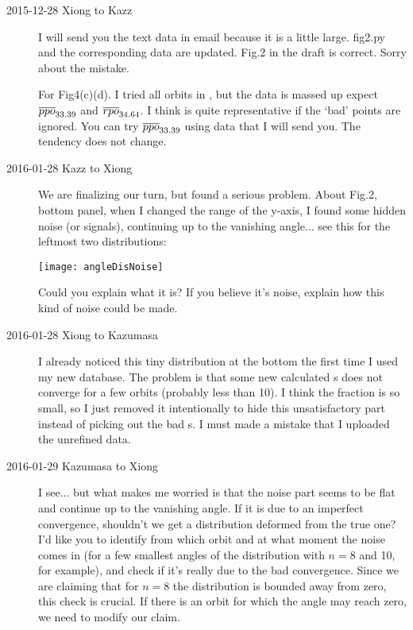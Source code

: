\begin{description}
\item[2015-12-28 Xiong to Kazz]
I will send you the text data in email because it is a little large.
fig2.py and the corresponding data are updated. Fig.2 in the draft is
correct. Sorry about the mistake.

For Fig4(c)(d). I tried all orbits in ,
but the data is massed up expect ${\overline{ppo}}_{33.39}$
and ${\overline{rpo}}_{34.64}$. I think 
is quite representative if the `bad' points are ignored.
You can try ${\overline{ppo}}_{33.39}$ using data
that I will send you. The tendency does not change.

\item[2016-01-28 Kazz to Xiong]
We are finalizing our turn, but found a serious problem. About Fig.2, bottom panel, when I changed the range of the y-axis, I found some hidden noise (or signals), continuing up to the vanishing angle... see this for the leftmost two distributions:

\begin{center}
 \texttt{[image: angleDisNoise]}
\end{center}

Could you explain what it is? If you believe it's noise, explain how this kind of noise could be made.

\item[2016-01-28 Xiong to Kazumasa]
I already noticed this tiny distribution at the bottom
the first time I used my new database. The problem is
that some new calculated \Fv s does not converge for a few
orbits (probably less than 10).
I think the fraction is so small, so I just
removed it intentionally to hide this
unsatisfactory part instead of picking out the bad \Fv s.
I must made a mistake that I uploaded the
unrefined data.

\item[2016-01-29 Kazumasa to Xiong]
I see... but what makes me worried is that the noise part seems to be flat and continue up to the vanishing angle. If it is due to an imperfect convergence, shouldn't we get a distribution deformed from the true one? I'd like you to identify from which orbit and at what moment the noise comes in (for a few smallest angles of the distribution with $n=8$ and 10, for example), and check if it's really due to the bad convergence.
Since we are claiming that for $n=8$ the distribution is bounded away from zero, this check is crucial. If there is an orbit for which the angle may reach zero, we need to modify our claim.


\end{description}
